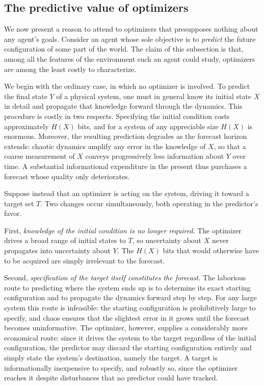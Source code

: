 \documentclass[11pt]{article}
\begin{document}
\subsection{The predictive value of optimizers}
\label{sec:prediction}

We now present a reason to attend to optimizers that presupposes nothing about any agent's goals. Consider an agent whose sole objective is to \emph{predict} the future configuration of some part of the world. The claim of this subsection is that, among all the features of the environment such an agent could study, optimizers are among the least costly to characterize.

We begin with the ordinary case, in which no optimizer is involved. To predict the final state $Y$ of a physical system, one must in general know its initial state $X$ in detail and propagate that knowledge forward through the dynamics. This procedure is costly in two respects. Specifying the initial condition costs approximately $H(X)$ bits, and for a system of any appreciable size $H(X)$ is enormous. Moreover, the resulting prediction degrades as the forecast horizon extends: chaotic dynamics amplify any error in the knowledge of $X$, so that a coarse measurement of $X$ conveys progressively less information about $Y$ over time. A substantial informational expenditure in the present thus purchases a forecast whose quality only deteriorates.

Suppose instead that an optimizer is acting on the system, driving it toward a target set $T$. Two changes occur simultaneously, both operating in the predictor's favor.

First, \emph{knowledge of the initial condition is no longer required}. The optimizer drives a broad range of initial states to $T$, so uncertainty about $X$ never propagates into uncertainty about $Y$. The $H(X)$ bits that would otherwise have to be acquired are simply irrelevant to the forecast.

Second, \emph{specification of the target itself constitutes the forecast}. The laborious route to predicting where the system ends up is to determine its exact starting configuration and to propagate the dynamics forward step by step. For any large system this route is infeasible: the starting configuration is prohibitively large to specify, and chaos ensures that the slightest error in it grows until the forecast becomes uninformative. The optimizer, however, supplies a considerably more economical route: since it drives the system to the target regardless of the initial configuration, the predictor may discard the starting configuration entirely and simply state the system's destination, namely the target. A target is informationally inexpensive to specify, and robustly so, since the optimizer reaches it despite disturbances that no predictor could have tracked.
\end{document}
